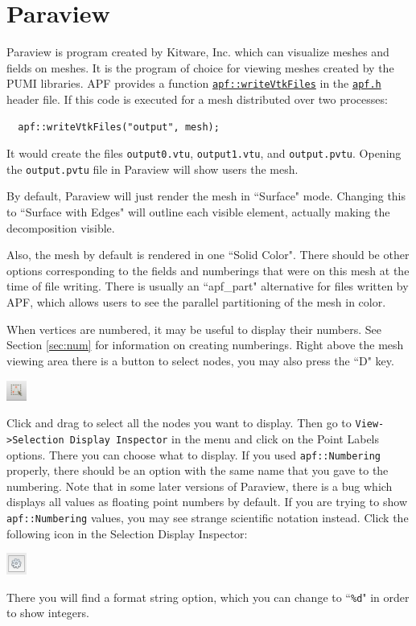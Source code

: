 \documentclass{article}
\begin{document}
\appendix

\section{Paraview}
\label{sec:paraview}

Paraview is program created by Kitware, Inc. which can visualize meshes
and fields on meshes.
It is the program of choice for viewing meshes created by the PUMI libraries.
APF provides a function
\href{http://scorec.rpi.edu/~dibanez/core/namespaceapf.html#a060af76b0bb25bffe37dc7a20e121936}{\texttt{apf::writeVtkFiles}}
in the
\href{https://github.com/SCOREC/core/blob/master/apf/apf.h}{\texttt{apf.h}}
header file.
If this code is executed for a mesh distributed over two processes:

\begin{lstlisting}
  apf::writeVtkFiles("output", mesh);
\end{lstlisting}

It would create the files \texttt{output0.vtu}, \texttt{output1.vtu},
and \texttt{output.pvtu}.
Opening the \texttt{output.pvtu} file in Paraview will show users the
mesh.

By default, Paraview will just render the mesh in ``Surface" mode.
Changing this to ``Surface with Edges" will outline each visible element,
actually making the decomposition visible.

Also, the mesh by default is rendered in one ``Solid Color".
There should be other options corresponding to the fields and numberings
that were on this mesh at the time of file writing.
There is usually an ``apf\_part" alternative for files written by APF, which
allows users to see the parallel partitioning of the mesh in color.

When vertices are numbered, it may be useful to display their numbers.
See Section \ref{sec:num} for information on creating numberings.
Right above the mesh viewing area there is a button to select nodes,
you may also press the ``D" key.

\begin{center}
\includegraphics[width=0.05\textwidth]{select_nodes.png}
\end{center}

Click and drag to select all the nodes you want to display.
Then go to \texttt{View->Selection Display Inspector} in the menu and click on
the Point Labels options.
There you can choose what to display.
If you used \texttt{apf::Numbering} properly, there should be an option
with the same name that you gave to the numbering.
Note that in some later versions of Paraview, there is a bug which
displays all values as floating point numbers by default.
If you are trying to show \texttt{apf::Numbering} values, you may
see strange scientific notation instead.
Click the following icon in the Selection Display Inspector:

\begin{center}
\includegraphics[width=0.05\textwidth]{gear.png}
\end{center}

There you will find a format string option, which you can change
to ``\texttt{\%d}" in order to show integers.
\end{document}
